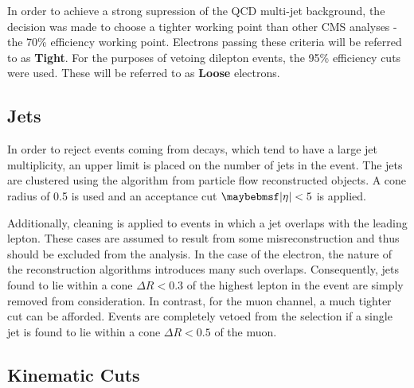 In order to achieve a strong supression of the \ac{QCD} multi-jet background,
the decision was made to choose a tighter working point than other \ac{CMS}
analyses - the 70\% efficiency working point. Electrons passing these criteria
will be referred to as \textbf{Tight}. For the purposes of vetoing dilepton
events, the 95\% efficiency cuts were used. These will be referred to as
\textbf{Loose} electrons.

\subsection{Jets}
\label{sec:wpol_jets}
In order to reject events coming from \ttbar decays, which tend to have a large
jet multiplicity, an upper limit is placed on the number of jets in the
event. The jets are clustered using the \antikT algorithm from particle flow
reconstructed objects. A cone radius of 0.5 is used and an acceptance cut
$\modeta < 5$ is applied.

Additionally, cleaning is applied to events in which a jet overlaps with the
leading lepton. These cases are assumed to result from some misreconstruction
and thus should be excluded from the analysis. In the case of the electron, the
nature of the reconstruction algorithms introduces many such
overlaps. Consequently, jets found to lie within a cone $\Delta R < 0.3$ of the
highest \Pt lepton in the event are simply removed from consideration. In
contrast, for the muon channel, a much tighter cut can be afforded. Events are
completely vetoed from the selection if a single jet is found to lie within a
cone $\Delta R < 0.5$ of the muon.

\subsection{Kinematic Cuts}

